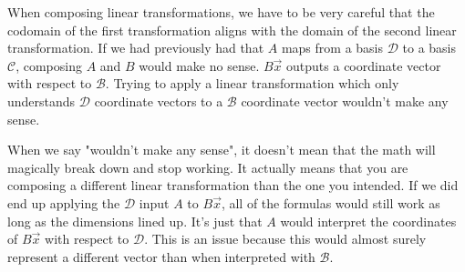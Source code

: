 When composing linear transformations, we have to be very careful that the codomain of the first transformation aligns with the domain of the second linear transformation. If we had previously had that $A$ maps from a basis $\mathcal{D}$ to a basis $\mathcal{C}$, composing $A$ and $B$ would make no sense. $B\vec{x}$ outputs a coordinate vector with respect to $\mathcal{B}$. Trying to apply a linear transformation which only understands $\mathcal{D}$ coordinate vectors to a $\mathcal{B}$ coordinate vector wouldn't make any sense.
\begin{remark}
    When we say "wouldn't make any sense", it doesn't mean that the math will magically break down and stop working. It actually means that you are composing a different linear transformation than the one you intended. If we did end up applying the $\mathcal{D}$ input $A$ to $B\vec{x}$, all of the formulas would still work as long as the dimensions lined up. It's just that $A$ would interpret the coordinates of $B\vec{x}$ with respect to $\mathcal{D}$. This is an issue because this would almost surely represent a different vector than when interpreted with $\mathcal{B}$.
\end{remark}
